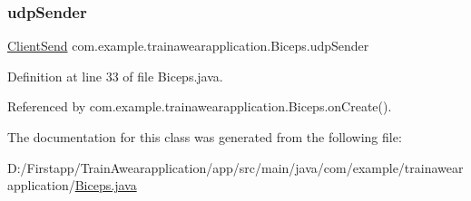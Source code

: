 \subsubsection{\texorpdfstring{udpSender}{udpSender}}
{\footnotesize\ttfamily \mbox{\hyperlink{classcom_1_1example_1_1trainawearapplication_1_1_client_send}{Client\+Send}} com.\+example.\+trainawearapplication.\+Biceps.\+udp\+Sender\hspace{0.3cm}{\ttfamily [private]}}



Definition at line 33 of file Biceps.\+java.



Referenced by com.\+example.\+trainawearapplication.\+Biceps.\+on\+Create().



The documentation for this class was generated from the following file\+:\begin{DoxyCompactItemize}
\item 
D\+:/\+Firstapp/\+Train\+Awearapplication/app/src/main/java/com/example/trainawearapplication/\mbox{\hyperlink{_biceps_8java}{Biceps.\+java}}\end{DoxyCompactItemize}
